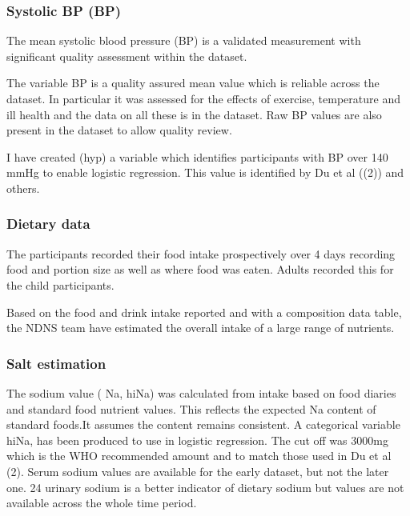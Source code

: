 \documentclass[
]{article}
\begin{document}
\hypertarget{systolic-bp-bp}{%
\subsubsection{Systolic BP (BP)}\label{systolic-bp-bp}}

The mean systolic blood pressure (BP) is a validated measurement with
significant quality assessment within the dataset.

The variable BP is a quality assured mean value which is reliable across
the dataset. In particular it was assessed for the effects of exercise,
temperature and ill health and the data on all these is in the dataset.
Raw BP values are also present in the dataset to allow quality review.

I have created (hyp) a variable which identifies participants with BP
over 140 mmHg to enable logistic regression. This value is identified by
Du et al ((2)) and others.

\hypertarget{dietary-data}{%
\subsubsection{Dietary data}\label{dietary-data}}

The participants recorded their food intake prospectively over 4 days
recording food and portion size as well as where food was eaten. Adults
recorded this for the child participants.

Based on the food and drink intake reported and with a composition data
table, the NDNS team have estimated the overall intake of a large range
of nutrients.

\hypertarget{salt-estimation}{%
\subsubsection{Salt estimation}\label{salt-estimation}}

The sodium value ( Na, hiNa) was calculated from intake based on food
diaries and standard food nutrient values. This reflects the expected Na
content of standard foods.It assumes the content remains consistent. A
categorical variable hiNa, has been produced to use in logistic
regression. The cut off was 3000mg which is the WHO recommended amount
and to match those used in Du et al (2). Serum sodium values are
available for the early dataset, but not the later one. 24 urinary
sodium is a better indicator of dietary sodium but values are not
available across the whole time period.
\end{document}
